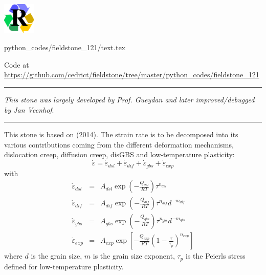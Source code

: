 \includegraphics[height=1.5cm]{images/pictograms/replication}

\begin{flushright} {\tiny {\color{gray} python\_codes/fieldstone\_121/text.tex}} \end{flushright}

\begin{center}

Code at \url{https://github.com/cedrict/fieldstone/tree/master/python_codes/fieldstone_121}
\end{center}

\par\noindent\rule{\textwidth}{0.4pt}

{\sl This stone was largely developed by Prof. Gueydan and later improved/debugged 
by Jan Veenhof}. 

\par\noindent\rule{\textwidth}{0.4pt}

This stone is based on \textcite{gupr14} (2014). 
The strain rate is to be decomposed into its various contributions 
coming from the different deformation mechanisms, dislocation creep,
diffusion creep, disGBS and low-temperature plasticity:
\[
\dot\varepsilon = \dot\varepsilon_{dsl} + \dot\varepsilon_{dif} + 
\dot\varepsilon_{gbs} + \dot\varepsilon_{exp} 
\]
with
\begin{eqnarray}
\dot{\varepsilon}_{dsl}&=&A_{dsl}\exp\left(-\frac{Q_{dsl}}{RT} \right) \tau^{n_{dsl}}  \\
\dot{\varepsilon}_{dif}&=&A_{dif}\exp\left(-\frac{Q_{dif}}{RT} \right) \tau^{n_{dif}} d^{-m_{dif}} \\
\dot{\varepsilon}_{gbs}&=&A_{gbs}\exp\left(-\frac{Q_{gbs}}{RT} \right) \tau^{n_{gbs}} d^{-m_{gbs}} \\
\dot{\varepsilon}_{exp}&=&A_{exp}\exp\left[-\frac{Q_{exp}}{RT} \left(1 -\frac{\tau}{\tau_p}\right)^{n_{exp}} \right]   
\end{eqnarray}
where $d$ is the grain size, $m$ is the grain size exponent, $\tau_p$ is the Peierls stress defined
for low-temperature plasticity.

